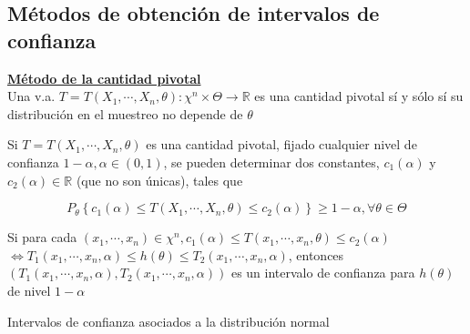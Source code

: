 \subsection{Métodos de obtención de intervalos de confianza}
\underline{\textbf{Método de la cantidad pivotal}}\\
Una v.a. $T=T\left(X_{1}, \cdots, X_{n}, \theta\right): \chi^{n} \times \Theta
    \rightarrow \mathbb{R}$ es una cantidad pivotal sí y sólo sí su distribución en
el muestreo no depende de $\theta$

Si $T=T\left(X_{1}, \cdots, X_{n}, \theta\right)$ es una cantidad pivotal,
fijado cualquier nivel de confianza $1-\alpha, \alpha \in(0,1)$, se pueden
determinar dos constantes, $c_{1}(\alpha)$ y $c_{2}(\alpha) \in \mathbb{R}$
(que no son únicas), tales que

$$
    P_{\theta}\left\{c_{1}(\alpha) \leq T\left(X_{1}, \cdots, X_{n}, \theta\right) \leq c_{2}(\alpha)\right\} \geq 1-\alpha, \forall \theta \in \Theta
$$

Si para cada $\left(x_{1}, \cdots, x_{n}\right) \in \chi^{n}, c_{1}(\alpha)
    \leq T\left(x_{1}, \cdots, x_{n}, \theta\right) \leq c_{2}(\alpha)$
$\Leftrightarrow T_{1}\left(x_{1}, \cdots, x_{n}, \alpha\right) \leq h(\theta)
    \leq T_{2}\left(x_{1}, \cdots, x_{n}, \alpha\right)$, entonces
$\left(T_{1}\left(x_{1}, \cdots, x_{n}, \alpha\right), T_{2}\left(x_{1},
    \cdots, x_{n}, \alpha\right)\right)$ es un intervalo de confianza para
$h(\theta)$ de nivel $1-\alpha$

Intervalos de confianza asociados a la distribución normal\\




